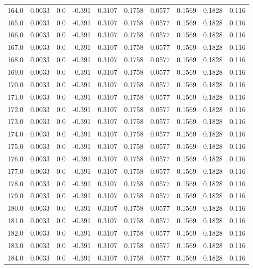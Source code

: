 \begin{longtable}{lrrrrrrrrr}
164.0 & 0.0033 & 0.0 & -0.391 & 0.3107 & 0.1758 & 0.0577 & 0.1569 & 0.1828 & 0.116 \\
165.0 & 0.0033 & 0.0 & -0.391 & 0.3107 & 0.1758 & 0.0577 & 0.1569 & 0.1828 & 0.116 \\
166.0 & 0.0033 & 0.0 & -0.391 & 0.3107 & 0.1758 & 0.0577 & 0.1569 & 0.1828 & 0.116 \\
167.0 & 0.0033 & 0.0 & -0.391 & 0.3107 & 0.1758 & 0.0577 & 0.1569 & 0.1828 & 0.116 \\
168.0 & 0.0033 & 0.0 & -0.391 & 0.3107 & 0.1758 & 0.0577 & 0.1569 & 0.1828 & 0.116 \\
169.0 & 0.0033 & 0.0 & -0.391 & 0.3107 & 0.1758 & 0.0577 & 0.1569 & 0.1828 & 0.116 \\
170.0 & 0.0033 & 0.0 & -0.391 & 0.3107 & 0.1758 & 0.0577 & 0.1569 & 0.1828 & 0.116 \\
171.0 & 0.0033 & 0.0 & -0.391 & 0.3107 & 0.1758 & 0.0577 & 0.1569 & 0.1828 & 0.116 \\
172.0 & 0.0033 & 0.0 & -0.391 & 0.3107 & 0.1758 & 0.0577 & 0.1569 & 0.1828 & 0.116 \\
173.0 & 0.0033 & 0.0 & -0.391 & 0.3107 & 0.1758 & 0.0577 & 0.1569 & 0.1828 & 0.116 \\
174.0 & 0.0033 & 0.0 & -0.391 & 0.3107 & 0.1758 & 0.0577 & 0.1569 & 0.1828 & 0.116 \\
175.0 & 0.0033 & 0.0 & -0.391 & 0.3107 & 0.1758 & 0.0577 & 0.1569 & 0.1828 & 0.116 \\
176.0 & 0.0033 & 0.0 & -0.391 & 0.3107 & 0.1758 & 0.0577 & 0.1569 & 0.1828 & 0.116 \\
177.0 & 0.0033 & 0.0 & -0.391 & 0.3107 & 0.1758 & 0.0577 & 0.1569 & 0.1828 & 0.116 \\
178.0 & 0.0033 & 0.0 & -0.391 & 0.3107 & 0.1758 & 0.0577 & 0.1569 & 0.1828 & 0.116 \\
179.0 & 0.0033 & 0.0 & -0.391 & 0.3107 & 0.1758 & 0.0577 & 0.1569 & 0.1828 & 0.116 \\
180.0 & 0.0033 & 0.0 & -0.391 & 0.3107 & 0.1758 & 0.0577 & 0.1569 & 0.1828 & 0.116 \\
181.0 & 0.0033 & 0.0 & -0.391 & 0.3107 & 0.1758 & 0.0577 & 0.1569 & 0.1828 & 0.116 \\
182.0 & 0.0033 & 0.0 & -0.391 & 0.3107 & 0.1758 & 0.0577 & 0.1569 & 0.1828 & 0.116 \\
183.0 & 0.0033 & 0.0 & -0.391 & 0.3107 & 0.1758 & 0.0577 & 0.1569 & 0.1828 & 0.116 \\
184.0 & 0.0033 & 0.0 & -0.391 & 0.3107 & 0.1758 & 0.0577 & 0.1569 & 0.1828 & 0.116 \\

\end{longtable}

